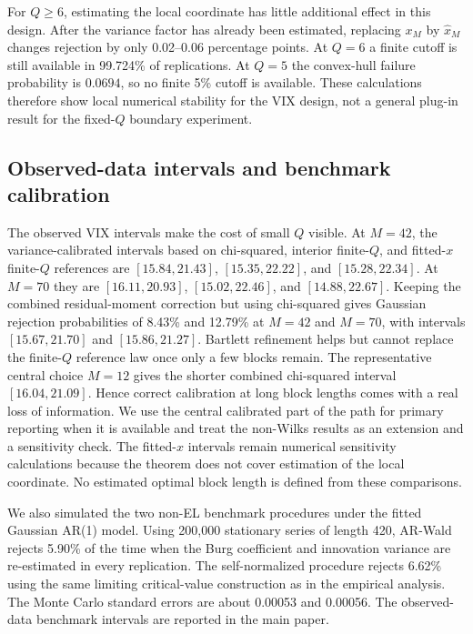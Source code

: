 \documentclass[12pt]{article}
\theoremstyle{remark}
\begin{document}
For $Q\ge6$, estimating the local coordinate has little additional effect in this design. After the variance factor has already been estimated, replacing $x_M$ by $\widehat x_M$ changes rejection by only 0.02--0.06 percentage points. At $Q=6$ a finite cutoff is still available in 99.724\% of replications. At $Q=5$ the convex-hull failure probability is $0.0694$, so no finite 5\% cutoff is available. These calculations therefore show local numerical stability for the VIX design, not a general plug-in result for the fixed-$Q$ boundary experiment.

\subsection{Observed-data intervals and benchmark calibration}
The observed VIX intervals make the cost of small $Q$ visible. At $M=42$, the variance-calibrated intervals based on chi-squared, interior finite-$Q$, and fitted-$x$ finite-$Q$ references are $[15.84,21.43]$, $[15.35,22.22]$, and $[15.28,22.34]$. At $M=70$ they are $[16.11,20.93]$, $[15.02,22.46]$, and $[14.88,22.67]$. Keeping the combined residual-moment correction but using chi-squared gives Gaussian rejection probabilities of 8.43\% and 12.79\% at $M=42$ and $M=70$, with intervals $[15.67,21.70]$ and $[15.86,21.27]$. Bartlett refinement helps but cannot replace the finite-$Q$ reference law once only a few blocks remain. The representative central choice $M=12$ gives the shorter combined chi-squared interval $[16.04,21.09]$. Hence correct calibration at long block lengths comes with a real loss of information. We use the central calibrated part of the path for primary reporting when it is available and treat the non-Wilks results as an extension and a sensitivity check. The fitted-$x$ intervals remain numerical sensitivity calculations because the theorem does not cover estimation of the local coordinate. No estimated optimal block length is defined from these comparisons.

We also simulated the two non-EL benchmark procedures under the fitted Gaussian AR(1) model. Using 200,000 stationary series of length 420, AR-Wald rejects 5.90\% of the time when the Burg coefficient and innovation variance are re-estimated in every replication. The self-normalized procedure rejects 6.62\% using the same limiting critical-value construction as in the empirical analysis. The Monte Carlo standard errors are about 0.00053 and 0.00056. The observed-data benchmark intervals are reported in the main paper.
\end{document}

